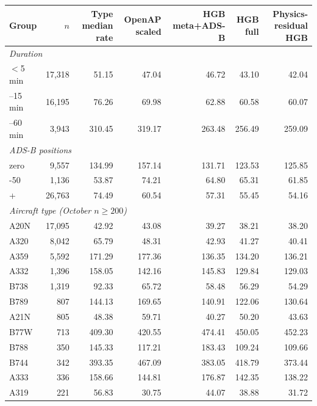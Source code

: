 \begin{tabular}{lrrrrrr}
\toprule
Group & $n$ & Type median rate & OpenAP scaled & HGB meta+ADS-B & HGB full & Physics-residual HGB \\
\midrule
\multicolumn{7}{l}{\emph{Duration}} \\
\quad $<$5 min & 17,318 & 51.15 & 47.04 & 46.72 & 43.10 & 42.04 \\
\quad 5--15 min & 16,195 & 76.26 & 69.98 & 62.88 & 60.58 & 60.07 \\
\quad 15--60 min & 3,943 & 310.45 & 319.17 & 263.48 & 256.49 & 259.09 \\
\multicolumn{7}{l}{\emph{ADS-B positions}} \\
\quad zero & 9,557 & 134.99 & 157.14 & 131.71 & 123.53 & 125.85 \\
\quad 1-50 & 1,136 & 53.87 & 74.21 & 64.80 & 65.31 & 61.85 \\
\quad 51+ & 26,763 & 74.49 & 60.54 & 57.31 & 55.45 & 54.16 \\
\multicolumn{7}{l}{\emph{Aircraft type (October $n \geq 200$)}} \\
\quad A20N & 17,095 & 42.92 & 43.08 & 39.27 & 38.21 & 38.20 \\
\quad A320 & 8,042 & 65.79 & 48.31 & 42.93 & 41.27 & 40.41 \\
\quad A359 & 5,592 & 171.29 & 177.36 & 136.35 & 134.20 & 136.21 \\
\quad A332 & 1,396 & 158.05 & 142.16 & 145.83 & 129.84 & 129.03 \\
\quad B738 & 1,319 & 92.33 & 65.72 & 58.48 & 56.29 & 54.29 \\
\quad B789 & 807 & 144.13 & 169.65 & 140.91 & 122.06 & 130.64 \\
\quad A21N & 805 & 48.38 & 59.71 & 40.27 & 50.20 & 43.63 \\
\quad B77W & 713 & 409.30 & 420.55 & 474.41 & 450.05 & 452.23 \\
\quad B788 & 350 & 145.33 & 117.21 & 183.43 & 109.24 & 109.66 \\
\quad B744 & 342 & 393.35 & 467.09 & 383.05 & 418.79 & 373.44 \\
\quad A333 & 336 & 158.66 & 144.81 & 176.87 & 142.35 & 138.22 \\
\quad A319 & 221 & 56.83 & 30.75 & 44.07 & 38.88 & 31.72 \\
\bottomrule
\end{tabular}
